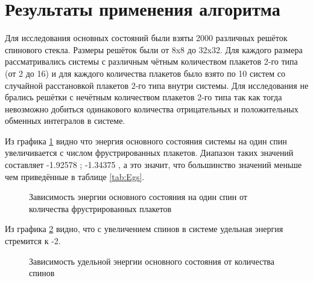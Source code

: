 \documentclass[utf8, babel, sor, jor, amsmath, amssymb, reprint]{elsarticle} %
\begin{document}
\section{Результаты применения алгоритма}
Для исследования основных состояний были взяты 2000 различных решёток спинового стекла.
Размеры решёток были от 8x8 до 32x32. Для каждого размера рассматривались системы с различным чётным количеством плакетов 2-го типа (от 2 до 16) и для каждого количества плакетов было взято по 10 систем со случайной расстановкой плакетов 2-го типа внутри системы. Для исследования не  брались решётки с нечётным количеством плакетов 2-го типа так как тогда невозможно добиться одинакового количества отрицательных и положительных обменных интегралов в системе. 

Из графика \ref{fig:Egs_N_F} видно что энергия основного состояния системы на один спин увеличивается с числом фрустрированных плакетов. Диапазон таких значений составляет -1.92578 ; -1.34375 , а это значит, что большинство значений меньше чем приведённые в таблице \ref{tab:Egs}. 

\begin{figure}[H]
	\centering
	\caption{Зависимость энергии основного состояния на один спин от количества фрустрированных плакетов}
	\label{fig:Egs_N_F}
\end{figure}

Из графика \ref{fig:Egs____N_F} видно, что с увеличением спинов в системе удельная энергия стремится к -2.

\begin{figure}[H]
	\centering
	\caption{Зависимость удельной энергии основного состояния от количества спинов}
	\label{fig:Egs____N_F}
\end{figure}
\end{document}
